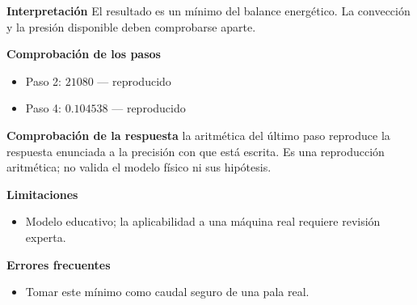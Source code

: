 \documentclass[10pt,openany]{book}
\begin{document}
\begin{tcolorbox}[title={Problema resuelto 2}, studiumworked, breakable]
\noindent\textbf{Interpretación}
El resultado es un mínimo del balance energético. La convección y la presión disponible deben comprobarse aparte.

\noindent\textbf{Comprobación de los pasos}
\begin{itemize}
\item Paso 2: $21080$ — reproducido
\item Paso 4: $0.104538$ — reproducido
\end{itemize}

\noindent\textbf{Comprobación de la respuesta} la aritmética del último paso reproduce la respuesta enunciada a la precisión con que está escrita. Es una reproducción aritmética; no valida el modelo físico ni sus hipótesis.

\noindent\textbf{Limitaciones}
\begin{itemize}
\item Modelo educativo; la aplicabilidad a una máquina real requiere revisión experta.
\end{itemize}

\noindent\textbf{Errores frecuentes}
\begin{itemize}
\item Tomar este mínimo como caudal seguro de una pala real.
\end{itemize}
\end{tcolorbox}
\end{document}
